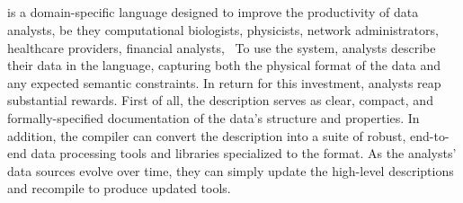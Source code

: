 


\subsection{\padsmlbig{}}


\padsml{} is a domain-specific language designed to 
improve the productivity of data analysts, be they computational biologists, physicists, network administrators, healthcare providers, financial analysts, \etc\
To use the system, analysts describe their data in the \padsml{} language, capturing both the physical format of the data and any expected semantic constraints.  In return for this investment, analysts reap substantial rewards.
First of all, the description
serves as clear, compact, and formally-specified documentation of 
the data's structure and properties.  In addition, the \padsml{}
compiler can convert the description into a suite of robust, end-to-end
data processing tools and libraries specialized
to the format.  As the analysts' data sources evolve over time,
they can simply update the high-level descriptions
and recompile to produce updated tools.


